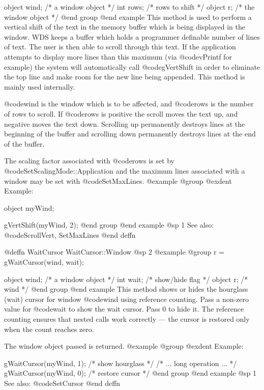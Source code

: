 object  wind;   /*  a window object     */
int     rows;   /*  rows to shift       */
object  r;      /*  the window object   */
@end group
@end example
This method is used to perform a vertical shift of the text in the
memory buffer which is being displayed in the window.  WDS keeps
a buffer which holds a programmer definable number of lines of text.
The user is then able to scroll through this text.  If the application
attempts to display more lines than this maximum (via @code{vPrintf}
for example) the system will automatically call @code{gVertShift} in
order to eliminate the top line and make room for the new line being
appended.  This method is mainly used internally.

@code{wind} is the window which is to be affected, and @code{rows} is the
number of rows to scroll.  If @code{rows} is positive the scroll moves
the text up, and negative moves the text down.  Scrolling up permanently
destroys lines at the beginning of the buffer and scrolling down
permanently destroys lines at the end of the buffer.

The scaling factor associated with @code{rows} is set by
@code{SetScalingMode::Application} and the maximum lines associated with
a window may be set with @code{SetMaxLines}.
@example
@group
@exdent Example:

object  myWind;

gVertShift(myWind, 2);
@end group
@end example
@sp 1
See also:  @code{ScrollVert, SetMaxLines}
@end deffn








@deffn {WaitCursor} WaitCursor::Window
@sp 2
@example
@group
r = gWaitCursor(wind, wait);

object  wind;   /*  a window object  */
int     wait;   /*  show/hide flag   */
object  r;      /*  wind             */
@end group
@end example
This method shows or hides the hourglass (wait) cursor for window
@code{wind} using reference counting.  Pass a non-zero value for
@code{wait} to show the wait cursor.  Pass 0 to hide it.  The
reference counting ensures that nested calls work correctly ---
the cursor is restored only when the count reaches zero.

The window object passed is returned.
@example
@group
@exdent Example:

gWaitCursor(myWind, 1);  /* show hourglass  */
/* ... long operation ... */
gWaitCursor(myWind, 0);  /* restore cursor  */
@end group
@end example
@sp 1
See also:  @code{SetCursor}
@end deffn










